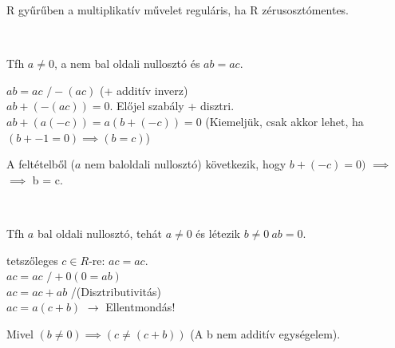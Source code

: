\begin{frame}
  \begin{tcolorbox}[title={Lemma: Nullosztó és regularitás}]
    R gyűrűben a multiplikatív művelet  reguláris, ha R zérusosztómentes.
  \tcblower
    \\
    \mmedskip

    \\
    \msmallskip
    
    Tfh $a \neq 0$, a nem bal oldali nullosztó és $ab = ac$.\\
    \msmallskip
    
    $ab = ac$  $/ -(ac)$ (+ additív inverz)\\
    $ab + (-(ac)) = 0$. Előjel szabály + disztri.\\
    $ab + (a(-c)) = a(b+(-c)) = 0$ (Kiemeljük, csak akkor lehet, ha $(b + -1 = 0) \implies (b = c)$)\\
    \msmallskip
    
    A feltételből ($a$ nem baloldali nullosztó) következik, hogy $b + (-c) = 0)$ $\implies$\\
    $\implies$ b = c.\\
    \bigskip

    \\
    \msmallskip
    
    Tfh $a$ bal oldali nullosztó, tehát $a \neq 0$ és létezik $b \neq 0\: ab = 0$.\\
    \msmallskip
    
    tetszőleges $c \in R$-re: $ac = ac$.\\
    $ac = ac$  $/ +0 (0 = ab)$\\
    $ac = ac + ab$ /(Disztributivitás)\\
    $ac = a(c + b)$ $\rightarrow$ Ellentmondás!\\
    \msmallskip
    
    Mivel $(b \neq 0) \implies (c \neq (c + b))$ (A b nem additív egységelem).
  \end{tcolorbox}
\end{frame}

